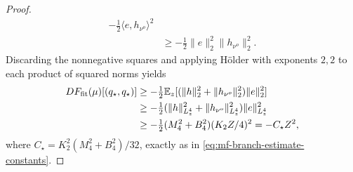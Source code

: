 \begin{proof}
\[\begin{aligned}
       -\tfrac12\langle e,h_{\nu^o}\rangle^2\\
 &\ge-\tfrac12\|e\|_2^2\|h_{\nu^o}\|_2^2.
\end{aligned}
\]
Discarding the nonnegative squares and applying H\"older with exponents
\(2,2\) to each product of squared norms yields
\begin{align}
 DF_{\mathrm{fit}}(\mu)[(q_\star,q_\star)]
 &\ge-\tfrac12\mathbb{E}_z[(\|h\|_2^2+\|h_{\nu^o}\|_2^2)\|e\|_2^2]\notag\\
 &\ge-\tfrac12(\|h\|_{L^4_z}^2+\|h_{\nu^o}\|_{L^4_z}^2)
                          \|e\|_{L^4_z}^2\notag\\
 &\ge-\tfrac12(M_4^2+B_4^2)(K_2Z/4)^2=-C_\star Z^2,
 \label{eq:mf-contraction-square-completion}
\end{align}
where \(C_\star=K_2^2(M_4^2+B_4^2)/32\), exactly as in
\cref{eq:mf-branch-estimate-constants}.


\end{proof}
